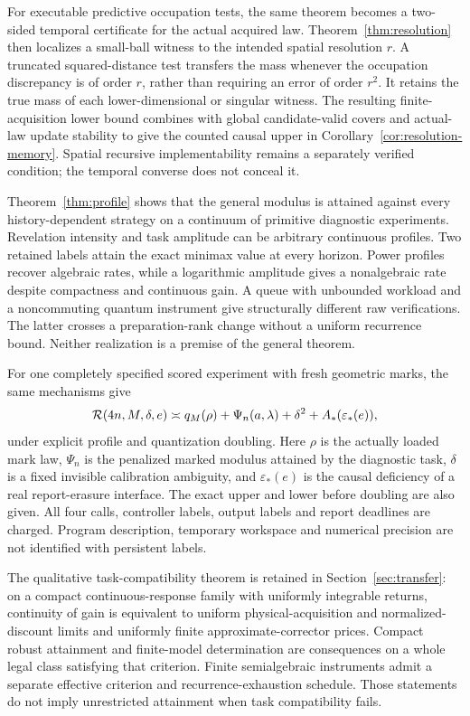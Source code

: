 For executable predictive occupation tests, the same theorem becomes a two-sided temporal certificate for the actual acquired law. Theorem~\ref{thm:resolution} then localizes a small-ball witness to the intended spatial resolution $r$. A truncated squared-distance test transfers the mass whenever the occupation discrepancy is of order $r$, rather than requiring an error of order $r^2$. It retains the true mass of each lower-dimensional or singular witness. The resulting finite-acquisition lower bound combines with global candidate-valid covers and actual-law update stability to give the counted causal upper in Corollary~\ref{cor:resolution-memory}. Spatial recursive implementability remains a separately verified condition; the temporal converse does not conceal it.

Theorem~\ref{thm:profile} shows that the general modulus is attained against every history-dependent strategy on a continuum of primitive diagnostic experiments. Revelation intensity and task amplitude can be arbitrary continuous profiles. Two retained labels attain the exact minimax value at every horizon. Power profiles recover algebraic rates, while a logarithmic amplitude gives a nonalgebraic rate despite compactness and continuous gain. A queue with unbounded workload and a noncommuting quantum instrument give structurally different raw verifications. The latter crosses a preparation-rank change without a uniform recurrence bound. Neither realization is a premise of the general theorem.

For one completely specified scored experiment with fresh geometric marks, the same mechanisms give
\begin{equation}\label{eq:intro-law}
 \mathcal R(4n,M,\delta,e)
 \asymp q_M(\rho)+\Psi_n(a,\lambda)+\delta^2
              +A_*(\varepsilon_*(e)),
\end{equation}
under explicit profile and quantization doubling. Here $\rho$ is the actually loaded mark law, $\Psi_n$ is the penalized marked modulus attained by the diagnostic task, $\delta$ is a fixed invisible calibration ambiguity, and $\varepsilon_*(e)$ is the causal deficiency of a real report-erasure interface. The exact upper and lower before doubling are also given. All four calls, controller labels, output labels and report deadlines are charged. Program description, temporary workspace and numerical precision are not identified with persistent labels.

The qualitative task-compatibility theorem is retained in Section~\ref{sec:transfer}: on a compact continuous-response family with uniformly integrable returns, continuity of gain is equivalent to uniform physical-acquisition and normalized-discount limits and uniformly finite approximate-corrector prices. Compact robust attainment and finite-model determination are consequences on a whole legal class satisfying that criterion. Finite semialgebraic instruments admit a separate effective criterion and recurrence-exhaustion schedule. Those statements do not imply unrestricted attainment when task compatibility fails.


